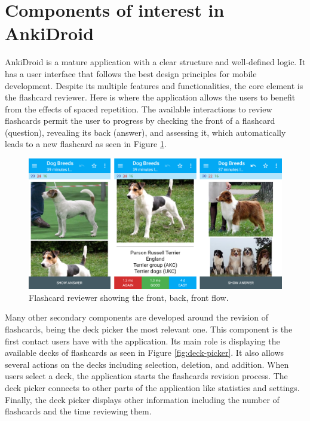 \section{Components of interest in AnkiDroid}
\label{desi-components-interest}
AnkiDroid is a mature application with a clear structure and well-defined logic. It has a user interface that follows the best design principles for mobile development. Despite its multiple features and functionalities, the core element is the flashcard reviewer. Here is where the application allows the users to benefit from the effects of spaced repetition. The available interactions to review flashcards permit the user to progress by checking the front of a flashcard (question), revealing its back (answer), and assessing it, which automatically leads to a new flashcard as seen in Figure \ref{fig:front-back-assess}.

\begin{figure}[htb]
    \vskip 5mm
        \begin{center}
            \includegraphics[scale=0.28]{./Figures/reviewer.png}
            \caption{Flashcard reviewer showing the front, back, front flow.}
            \label{fig:front-back-assess}
        \end{center}
    \vskip -5mm
\end{figure}

Many other secondary components are developed around the revision of flashcards, being the deck picker the most relevant one. This component is the first contact users have with the application. Its main role is displaying the available decks of flashcards as seen in Figure \ref{fig:deck-picker}. It also allows several actions on the decks including selection, deletion, and addition. When users select a deck, the application starts the flashcards revision process. The deck picker connects to other parts of the application like statistics and settings. Finally, the deck picker displays other information including the number of flashcards and the time reviewing them.

